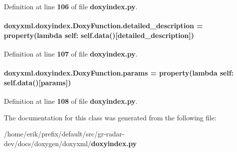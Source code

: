 Definition at line {\bf 106} of file {\bf doxyindex.\+py}.

\paragraph[{detailed\+\_\+description}]{\setlength{\rightskip}{0pt plus 5cm}doxyxml.\+doxyindex.\+Doxy\+Function.\+detailed\+\_\+description = {\bf property}(lambda self\+: {\bf self.\+data}()[\textquotesingle{}detailed\+\_\+description\textquotesingle{}])\hspace{0.3cm}{\ttfamily [static]}}\label{classdoxyxml_1_1doxyindex_1_1DoxyFunction_ac7ec387f2474664ec1776ad321e922c1}


Definition at line {\bf 107} of file {\bf doxyindex.\+py}.

\paragraph[{params}]{\setlength{\rightskip}{0pt plus 5cm}doxyxml.\+doxyindex.\+Doxy\+Function.\+params = {\bf property}(lambda self\+: {\bf self.\+data}()[\textquotesingle{}params\textquotesingle{}])\hspace{0.3cm}{\ttfamily [static]}}\label{classdoxyxml_1_1doxyindex_1_1DoxyFunction_aea6bde35be7eea42b3a904af210d7d91}


Definition at line {\bf 108} of file {\bf doxyindex.\+py}.



The documentation for this class was generated from the following file\+:\begin{DoxyCompactItemize}
\item 
/home/erik/prefix/default/src/gr-\/radar-\/dev/docs/doxygen/doxyxml/{\bf doxyindex.\+py}\end{DoxyCompactItemize}

